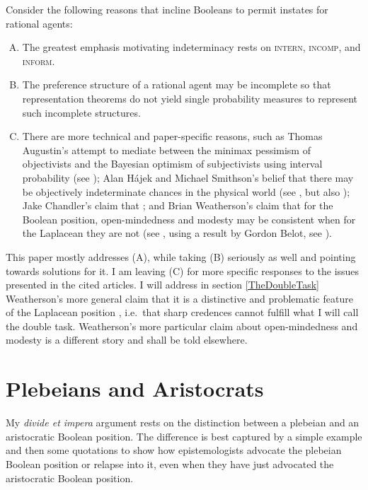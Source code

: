 \documentclass[12pt]{article}
\begin{document}
Consider the following reasons that incline Booleans to permit
instates for rational agents:

\begin{enumerate}[(A)]
\item The greatest emphasis motivating indeterminacy rests on
  \textsc{intern}, \textsc{incomp}, and \textsc{inform}.
\item The preference structure of a rational agent may be incomplete
  so that representation theorems do not yield single probability
  measures to represent such incomplete structures.
\item There are more technical and paper-specific reasons, such as
  Thomas Augustin's attempt to mediate between the minimax pessimism
  of objectivists and the Bayesian optimism of subjectivists using
  interval probability (see ); Alan
  H{\'a}jek and Michael Smithson's belief that there may be
  objectively indeterminate chances in the physical world (see
  , but also ); Jake Chandler's claim that 
  ; and Brian Weatherson's claim that for the
  Boolean position, open-mindedness and modesty may be consistent when
  for the Laplacean they are not (see , using
  a result by Gordon Belot, see ).
\end{enumerate}

This paper mostly addresses (A), while taking (B) seriously as well
and pointing towards solutions for it. I am leaving (C) for more
specific responses to the issues presented in the cited articles. I
will address in section \ref{TheDoubleTask} Weatherson's more general
claim that it is a distinctive and problematic feature of the
Laplacean position 
, i.e.\ that sharp credences cannot fulfill
what I will call the double task. Weatherson's more
particular claim about open-mindedness and modesty is a different
story and shall be told elsewhere.

\section{Plebeians and Aristocrats}
\label{PlebeiansAndAristocrats}

My \emph{divide et impera} argument rests on the distinction between a
plebeian and an aristocratic Boolean position. The difference is best
captured by a simple example and then some quotations to show how
epistemologists advocate the plebeian Boolean position or relapse into
it, even when they have just advocated the aristocratic Boolean
position.
\end{document}

